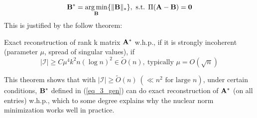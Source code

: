 \documentclass[../book-template.tex]{subfiles}
\begin{document}
\begin{equation}\label{eq_3_gen}
	{\bf B}^*=\mathop{\arg \min}_{{\bf B}} \{\|{\bf B}\|_*\},\ \text{s.t. } \Pi({\bf A}-{\bf B})=\bm{0}
\end{equation}
This is justified by the follow theorem:
\begin{theorem}\label{thm_3_gen_guarantee}
	Exact reconstruction of rank k matrix ${\bf A}^*$ w.h.p., if it is strongly incoherent (parameter $\mu$, spread of singular values), if
	\begin{equation*}
		|\mathcal{I}|\geq C\mu^4k^2n(\log n)^2\in \tilde{{O}}(n),\ \text{typically }\mu=O(\sqrt{n})
	\end{equation*}
\end{theorem}
This theorem shows that with $|\mathcal{I}|\geq \tilde{{O}}(n)\ (\ll n^2 \text{ for large } n)$, under certain conditions, ${\bf B}^*$ defined in (\ref{eq_3_gen}) can do exact reconstruction of ${\bf A}^*$ (on all entries) w.h.p., which to some degree explains why the nuclear norm minimization works well in practice.  
\end{document}
